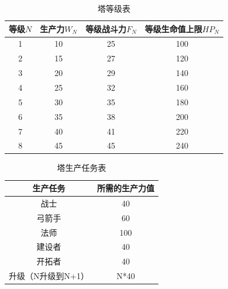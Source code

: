 \documentclass[a4paper,4pt]{article}
\begin{document}
\begin{table}[htbp]
  \centering
  \caption{塔等级表}
  \label{塔等级表}%
  \begin{tabular}{c|c|c|c}
    \hline
    等级$N$ & 生产力$W_N$ & 等级战斗力$F_N$ & 等级生命值上限$HP_N$ \bigstrut \\
    \hline
    1       & 10          & 25              & 100 \bigstrut                  \\
    \hline
    2       & 15          & 27              & 120 \bigstrut                  \\
    \hline
    3       & 20          & 29              & 140 \bigstrut                  \\
    \hline
    4       & 25          & 32              & 160 \bigstrut                  \\
    \hline
    5       & 30          & 35              & 180 \bigstrut                  \\
    \hline
    6       & 35          & 38              & 200 \bigstrut                  \\
    \hline
    7       & 40          & 41              & 220 \bigstrut                  \\
    \hline
    8       & 45          & 45              & 240 \bigstrut                  \\
    \hline
  \end{tabular}%

\end{table}%

\begin{table}[htbp]
  \centering
  \caption{塔生产任务表}
  \begin{tabular}{c|c}
    \hline
    生产任务           & 所需的生产力值 \bigstrut \\
    \hline
    战士               & 40 \bigstrut             \\
    \hline
    弓箭手             & 60 \bigstrut             \\
    \hline
    法师               & 100 \bigstrut            \\
    \hline
    建设者             & 40 \bigstrut             \\
    \hline
    开拓者             & 40 \bigstrut             \\
    \hline
    升级（N升级到N+1） & N*40 \bigstrut           \\
    \hline
  \end{tabular}%
  \label{塔生产}%
\end{table}%
\end{document}
